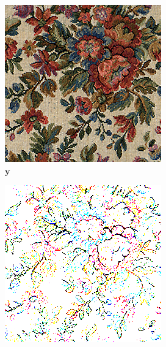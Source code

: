 \begin{figure}[]
\begin{subfigure}{\textwidth}
        \begin{subfigure}{0.24\textwidth}
            \centering
            \includegraphics[width=\textwidth]{images/04-experiment01/flowers/target.jpg}
            \caption*{\(\bm{y}\)}
        \end{subfigure}
        \hfill
        \begin{subfigure}{0.24\textwidth}
            \centering
            \includegraphics[width=\textwidth]{images/04-experiment01/flowers/threshold_bg.jpg}

\end{subfigure}
\end{subfigure}
\end{figure}
